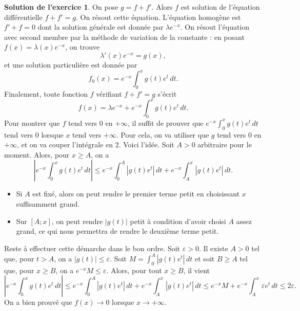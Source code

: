 \documentclass[a4paper, 11pt,openany]{article}%
\theoremstyle{plain}
\theoremstyle{definition}
\newtheorem{sol}{Solution de l'exercice}
\theoremstyle{remark}
\begin{document}
\begin{sol}
On pose $g=f+f'$. Alors $f$ est solution de l'équation différentielle $f+f'=g$. On résout cette équation. L'équation homogène est $f'+f=0$ dont la solution générale est donnée par $\lambda e^{-x}$. On résout l'équation avec second membre par la méthode de variation de la constante : en posant $f(x)=\lambda (x)e^{-x}$, on trouve \[ \lambda '(x)e^{-x}=g(x),\]
et une solution particulière est donnée par 
\[ f_0(x)=e^{-x}\int_0^x g(t)e^t \, dt.\] Finalement, toute fonction $f$ vérifiant $f+f'=g$ s'écrit 
\[ f(x)=\lambda e^{-x}+e^{-x} \int_0^x g(t)e^t \,dt.\]
Pour montrer que $f$ tend vers 0 en $+ \infty$, il suffit de prouver que $e^{-x} \int_0^x g(t) e^t \, dt$ tend vers 0 lorsque $x$ tend vers $+\infty$. Pour cela, on va utiliser que $g$ tend vers 0 en $+\infty$, et on va couper l'intégrale en 2. Voici l'idée. Soit $A>0$ arbitraire pour le moment. Alors, pour $x \geqslant A$, on a 
\[ \left| e^{-x} \int_0^x g(t) e^t \, dt \right|  \leqslant  e^{-x} \int_0^A |g(t) e^t| \, dt +  e^{-x} \int_A^x |g(t) e^t| \, dt.\]
\begin{itemize}
\item Si $A$ est fixé, alors on peut rendre le premier terme petit en choisissant $x$ suffisamment grand.
\item Sur $[A;x]$, on peut rendre $|g(t)|$ petit à condition d'avoir choisi $A$    assez grand, ce qui nous permettra de rendre le deuxième terme petit. 
\end{itemize}
Reste à effectuer cette démarche dans le bon ordre. Soit $ \varepsilon > 0$. Il existe $A>0$ tel que, pour $t>A$, on a $|g(t)| \leqslant \varepsilon$. Soit $M=\int_0^A |g(t) e^t| \, dt$ et soit $B \geqslant A$ tel que, pour $x \geqslant B$, on a $e^{-x}M \leqslant \varepsilon$. Alors, pour tout $x \geqslant B$, il vient
\[ \left| e^{-x} \int_0^x g(t) e^t \, dt \right|  \leqslant   e^{-x} \int_0^A |g(t) e^t| \, dt +  e^{-x} \int_A^x |g(t) e^t| \, dt \leqslant  e^{-x}M +  e^{-x} \int_A^x \varepsilon e^t \, dt \leqslant 2 \varepsilon.\] On a bien prouvé que $f(x) \to 0$ lorsque $x \to + \infty$.
\end{sol}
\end{document}
